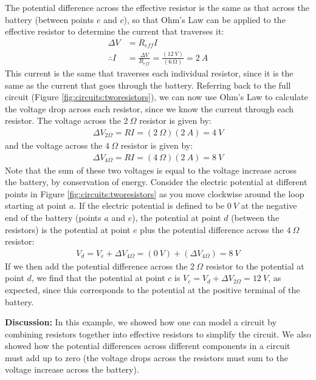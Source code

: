 \begin{example}
The potential difference across the effective resistor is the same as that across the battery (between points $e$ and $c$), so that Ohm's Law can be applied to the effective resistor to determine the current that traverses it:
\begin{align*}
\Delta V &= R_{eff}I\\
\therefore I&=\frac{\Delta V}{R_{eff}}=\frac{(\SI{12}{V})}{(\SI{6}{\ohm})}=\SI{2}{A}
\end{align*}
This current is the same that traverses each individual resistor, since it is the same as the current that goes through the battery. Referring back to the full circuit (Figure \ref{fig:circuits:tworesistors}), we can now use Ohm's Law to calculate the voltage drop across each resistor, since we know the current through each resistor. The voltage across the $\SI{2}{\Omega}$ resistor is given by:
\begin{align*}
\Delta V_{2\Omega}=RI=(\SI{2}{\Omega})(\SI{2}{A})=\SI{4}{V}
\end{align*}
and the voltage across the $\SI{4}{\Omega}$ resistor is given by:
\begin{align*}
\Delta V_{4\Omega}=RI=(\SI{4}{\Omega})(\SI{2}{A})=\SI{8}{V}
\end{align*}
Note that the sum of these two voltages is equal to the voltage increase across the battery, by conservation of energy. Consider the electric potential at different points in Figure \ref{fig:circuits:tworesistors} as you move clockwise around the loop starting at point $a$. If the electric potential is defined to be $\SI{0}{V}$ at the negative end of the battery (points $a$ and $e$), the potential at point $d$ (between the resistors) is the potential at point $e$ plus the potential difference across the $\SI{4}{\Omega}$ resistor:
\begin{align*}
V_d = V_e+\Delta V_{4\Omega}=(\SI{0}{V})+(\Delta V_{4\Omega})=\SI{8}{V}
\end{align*}
If we then add the potential difference across the $\SI{2}{\Omega}$ resistor to the potential at point $d$, we find  that the potential at point $c$ is $V_c=V_d+\Delta V_{2\Omega}=\SI{12}{V}$, as expected, since this corresponds to the potential at the positive terminal of the battery.

\textbf{Discussion: }In this example, we showed how one can model a circuit by combining resistors together into effective resistors to simplify the circuit. We also showed how the potential differences across different components in a circuit must add up to zero (the voltage drops across the resistors must sum to the voltage increase across the battery). 
\end{example}
